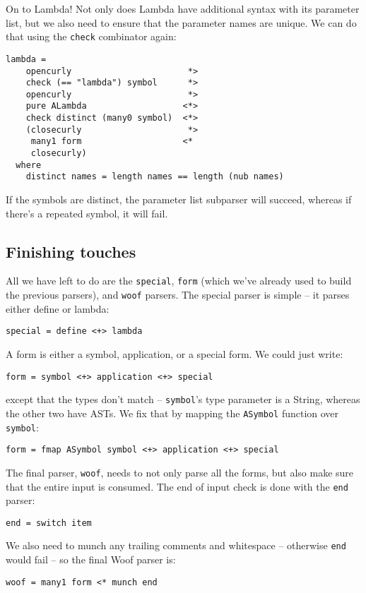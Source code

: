 \documentclass{tmr}
\begin{document}
On to Lambda!  Not only does Lambda have additional syntax with its parameter 
list, but we also need to ensure that the parameter names are unique.  We can 
do that using the \verb+check+ combinator again:
\begin{verbatim}
lambda = 
    opencurly                       *>
    check (== "lambda") symbol      *>
    opencurly                       *>
    pure ALambda                   <*>
    check distinct (many0 symbol)  <*>
    (closecurly                     *>
     many1 form                    <*
     closecurly)
  where
    distinct names = length names == length (nub names)
\end{verbatim}
If the symbols are distinct, the parameter list subparser will succeed,
whereas if there's a repeated symbol, it will fail.

\subsection{Finishing touches}
All we have left to do are the \verb+special+, \verb+form+ (which 
we've already used to build the previous parsers), and \verb+woof+ parsers.  
The special parser is simple -- it parses either define or lambda:
\begin{verbatim}
special = define <+> lambda
\end{verbatim}

A form is either a symbol, application, or a special form.  We could just write:
\begin{verbatim}
form = symbol <+> application <+> special
\end{verbatim}

except that the types don't match -- \verb+symbol+'s type parameter is a String, 
whereas the other two have ASTs.  We fix that by mapping the \verb+ASymbol+ 
function over \verb+symbol+:
\begin{verbatim}
form = fmap ASymbol symbol <+> application <+> special
\end{verbatim}

The final parser, \verb+woof+, needs to not only parse all the forms, but also 
make sure that the entire input is consumed.  The end of input check is done 
with the \verb+end+ parser:
\begin{verbatim}
end = switch item
\end{verbatim}

We also need to munch any trailing comments and whitespace -- otherwise \verb+end+
would fail -- so the final Woof parser is:
\begin{verbatim}
woof = many1 form <* munch end
\end{verbatim}
\end{document}
